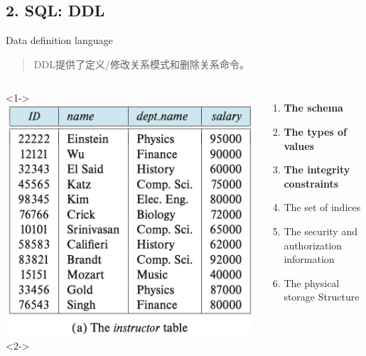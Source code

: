 \documentclass[aspectratio=169, 14pt]{beamer}
\begin{document}
\begin{frame}
	\section{\textcolor{darkmidnightblue}{2. SQL: DDL}}
	Data definition language
	\bigskip

	\begin{quote}
		DDL提供了\alert{定义/修改关系模式}和\alert{删除关系}命令。
	\end{quote}

\end{frame}

\begin{frame}
	\begin{columns}
		<1->
		\includegraphics[height=.68\paperheight]{table/instructor}
		<2->
		\begin{enumerate}
			\item \textbf{The schema}
			\item \textbf{The types of values}
			\item \textbf{The integrity constraints}
			\item The set of indices
			\item The security and authorization information
			\item The physical storage Structure
		\end{enumerate}
	\end{columns}



\end{frame}
\end{document}
